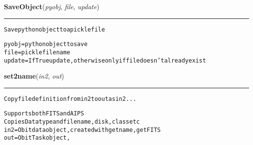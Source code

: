     \label{VLBACal:SaveObject}
    \vspace{0.5ex}

    \begin{boxedminipage}{\textwidth}

    \raggedright \textbf{SaveObject}(\textit{pyobj}, \textit{file}, \textit{update})

    \vspace{-1.5ex}

    \rule{\textwidth}{0.5\fboxrule}
\begin{alltt}
Save python object to a pickle file

pyobj    = python object to save
file     = pickle file name
update   = If True update, otherwise only if file doesn't already exist\end{alltt}

    \vspace{1ex}

    \end{boxedminipage}

    \label{VLBACal:set2name}
    \vspace{0.5ex}

    \begin{boxedminipage}{\textwidth}

    \raggedright \textbf{set2name}(\textit{in2}, \textit{out})

    \vspace{-1.5ex}

    \rule{\textwidth}{0.5\fboxrule}
\begin{alltt}
Copy file definition from in2 to out as in2...

Supports both FITS and AIPS
Copies Data type and file name, disk, class etc
in2  = Obit data object, created with getname, getFITS
out  = ObitTask object,\end{alltt}

    \vspace{1ex}

    \end{boxedminipage}

    \label{VLBACal:setname}
    \vspace{0.5ex}

